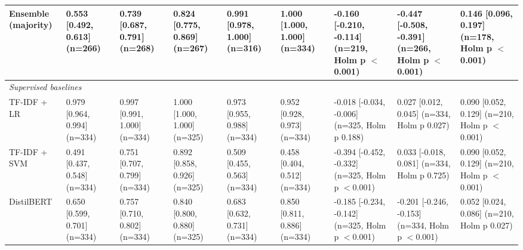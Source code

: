 \begin{tabular}{lllllllll}
Ensemble (majority) & 0.553 [0.492, 0.613] (n=266) & 0.739 [0.687, 0.791] (n=268) & 0.824 [0.775, 0.869] (n=267) & 0.991 [0.978, 1.000] (n=316) & 1.000 [1.000, 1.000] (n=334) & -0.160 [-0.210, -0.114] (n=219, Holm p $<$0.001) & -0.447 [-0.508, -0.391] (n=266, Holm p $<$0.001) & 0.146 [0.096, 0.197] (n=178, Holm p $<$0.001) \\
\midrule
\multicolumn{9}{l}{\textit{Supervised baselines}} \\
TF-IDF + LR & 0.979 [0.964, 0.994] (n=334) & 0.997 [0.991, 1.000] (n=334) & 1.000 [1.000, 1.000] (n=325) & 0.973 [0.955, 0.988] (n=334) & 0.952 [0.928, 0.973] (n=334) & -0.018 [-0.034, -0.006] (n=325, Holm p 0.188) & 0.027 [0.012, 0.045] (n=334, Holm p 0.027) & 0.090 [0.052, 0.129] (n=210, Holm p $<$0.001) \\
TF-IDF + SVM & 0.491 [0.437, 0.548] (n=334) & 0.751 [0.707, 0.799] (n=334) & 0.892 [0.858, 0.926] (n=325) & 0.509 [0.455, 0.563] (n=334) & 0.458 [0.404, 0.512] (n=334) & -0.394 [-0.452, -0.332] (n=325, Holm p $<$0.001) & 0.033 [-0.018, 0.081] (n=334, Holm p 0.725) & 0.090 [0.052, 0.129] (n=210, Holm p $<$0.001) \\
DistilBERT & 0.650 [0.599, 0.701] (n=334) & 0.757 [0.710, 0.802] (n=334) & 0.840 [0.800, 0.880] (n=325) & 0.683 [0.632, 0.731] (n=334) & 0.850 [0.811, 0.886] (n=334) & -0.185 [-0.234, -0.142] (n=325, Holm p $<$0.001) & -0.201 [-0.246, -0.153] (n=334, Holm p $<$0.001) & 0.052 [0.024, 0.086] (n=210, Holm p 0.027) \\
\bottomrule
\end{tabular}
